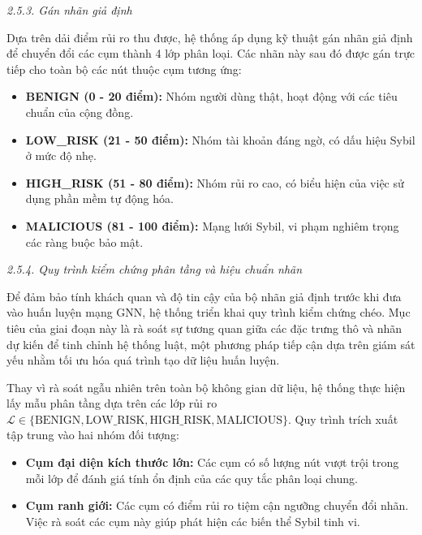 
\textit{2.5.3. Gán nhãn giả định}\vspace{0.2cm}

Dựa trên dải điểm rủi ro thu được, hệ thống áp dụng kỹ thuật gán nhãn giả định\cite{lee2013pseudo} để chuyển đổi các cụm thành 4 lớp phân loại. Các nhãn này sau đó được gán trực tiếp cho toàn bộ các nút thuộc cụm tương ứng:
\begin{itemize}[label={--}, itemsep=1pt]
    \item \textbf{BENIGN (0 - 20 điểm):} Nhóm người dùng thật, hoạt động với các tiêu chuẩn của cộng đồng.
    \item \textbf{LOW\_RISK (21 - 50 điểm):} Nhóm tài khoản đáng ngờ, có dấu hiệu Sybil ở mức độ nhẹ.
    \item \textbf{HIGH\_RISK (51 - 80 điểm):} Nhóm rủi ro cao, có biểu hiện của việc sử dụng phần mềm tự động hóa.
    \item \textbf{MALICIOUS (81 - 100 điểm):} Mạng lưới Sybil, vi phạm nghiêm trọng các ràng buộc bảo mật.
\end{itemize}


\textit{2.5.4. Quy trình kiểm chứng phân tầng và hiệu chuẩn nhãn}\vspace{0.2cm}

Để đảm bảo tính khách quan và độ tin cậy của bộ nhãn giả định \cite{lee2013pseudo} trước khi đưa vào huấn luyện mạng GNN, hệ thống triển khai quy trình kiểm chứng chéo. Mục tiêu của giai đoạn này là rà soát sự tương quan giữa các đặc trưng thô và nhãn dự kiến để tinh chỉnh hệ thống luật, một phương pháp tiếp cận dựa trên giám sát yếu nhằm tối ưu hóa quá trình tạo dữ liệu huấn luyện.\vspace{0.3cm}

Thay vì rà soát ngẫu nhiên trên toàn bộ không gian dữ liệu, hệ thống thực hiện lấy mẫu phân tầng dựa trên các lớp rủi ro $\mathcal{L} \in \{ \text{BENIGN}, \allowbreak \text{LOW\_RISK}, \allowbreak \text{HIGH\_RISK}, \allowbreak \text{MALICIOUS} \}$. Quy trình trích xuất tập trung vào hai nhóm đối tượng:
\begin{itemize}[label={--}, itemsep=1pt]
    \item \textbf{Cụm đại diện kích thước lớn:} Các cụm có số lượng nút vượt trội trong mỗi lớp để đánh giá tính ổn định của các quy tắc phân loại chung.
    \item \textbf{Cụm ranh giới:} Các cụm có điểm rủi ro tiệm cận ngưỡng chuyển đổi nhãn. Việc rà soát các cụm này giúp phát hiện các biến thể Sybil tinh vi.
\end{itemize}

